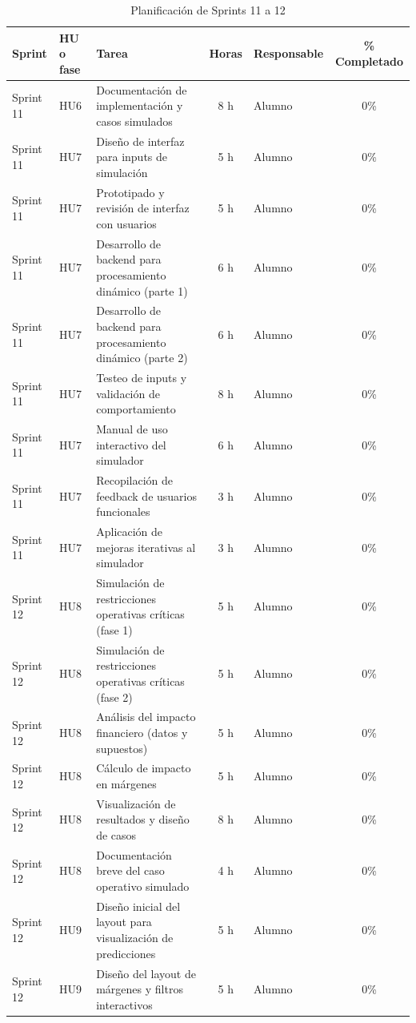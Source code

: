 \documentclass[
11pt, %
]{charter}
\begin{document}
\begin{table}[htpb]
\centering
\caption{Planificación de Sprints 11 a 12}
\begin{tabularx}{\linewidth}{@{}|l|l|X|c|l|c|@{}}
\hline
\rowcolor[HTML]{C0C0C0}
Sprint & HU o fase & Tarea & Horas & Responsable & \% Completado \\ \hline
Sprint 11 & HU6 & Documentación de implementación y casos simulados & 8 h & Alumno & 0\% \\ \hline
Sprint 11 & HU7 & Diseño de interfaz para inputs de simulación & 5 h & Alumno & 0\% \\ \hline
Sprint 11 & HU7 & Prototipado y revisión de interfaz con usuarios & 5 h & Alumno & 0\% \\ \hline
Sprint 11 & HU7 & Desarrollo de backend para procesamiento dinámico (parte 1) & 6 h & Alumno & 0\% \\ \hline
Sprint 11 & HU7 & Desarrollo de backend para procesamiento dinámico (parte 2) & 6 h & Alumno & 0\% \\ \hline
Sprint 11 & HU7 & Testeo de inputs y validación de comportamiento & 8 h & Alumno & 0\% \\ \hline
Sprint 11 & HU7 & Manual de uso interactivo del simulador & 6 h & Alumno & 0\% \\ \hline
Sprint 11 & HU7 & Recopilación de feedback de usuarios funcionales & 3 h & Alumno & 0\% \\ \hline
Sprint 11 & HU7 & Aplicación de mejoras iterativas al simulador & 3 h & Alumno & 0\% \\ \hline
\hline
Sprint 12 & HU8 & Simulación de restricciones operativas críticas (fase 1) & 5 h & Alumno & 0\% \\ \hline
Sprint 12 & HU8 & Simulación de restricciones operativas críticas (fase 2) & 5 h & Alumno & 0\% \\ \hline
Sprint 12 & HU8 & Análisis del impacto financiero (datos y supuestos) & 5 h & Alumno & 0\% \\ \hline
Sprint 12 & HU8 & Cálculo de impacto en márgenes & 5 h & Alumno & 0\% \\ \hline
Sprint 12 & HU8 & Visualización de resultados y diseño de casos & 8 h & Alumno & 0\% \\ \hline
Sprint 12 & HU8 & Documentación breve del caso operativo simulado & 4 h & Alumno & 0\% \\ \hline
Sprint 12 & HU9 & Diseño inicial del layout para visualización de predicciones & 5 h & Alumno & 0\% \\ 
Sprint 12 & HU9 & Diseño del layout de márgenes y filtros interactivos & 5 h & Alumno & 0\% \\ \hline
\end{tabularx}
\end{table}
\end{document}

